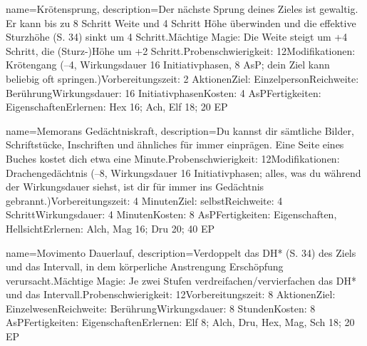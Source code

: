 {
    name={Krötensprung},
    description={Der nächste Sprung deines Zieles ist gewaltig. Er kann bis zu 8 Schritt Weite und 4 Schritt Höhe überwinden und die effektive Sturzhöhe (S. 34) sinkt um 4 Schritt.\newline Mächtige Magie: Die Weite steigt um +4 Schritt,  die (Sturz-)Höhe um +2 Schritt.\newline Probenschwierigkeit: 12\newline Modifikationen: Krötengang (–4, Wirkungsdauer 16 Initiativphasen, 8 AsP; dein Ziel kann beliebig oft springen.)\newline Vorbereitungszeit: 2 Aktionen\newline Ziel: Einzelperson\newline Reichweite: Berührung\newline Wirkungsdauer: 16 Initiativphasen\newline Kosten: 4 AsP\newline Fertigkeiten: Eigenschaften\newline Erlernen: Hex 16; Ach, Elf 18; 20 EP}
}


{
    name={Memorans Gedächtniskraft},
    description={Du kannst dir sämtliche Bilder, Schriftstücke, Inschriften und ähnliches für immer einprägen. Eine Seite eines Buches kostet dich etwa eine Minute.\newline Probenschwierigkeit: 12\newline Modifikationen: Drachengedächtnis (–8, Wirkungsdauer 16 Initiativphasen; alles, was du während der Wirkungsdauer siehst, ist dir für immer ins Gedächtnis gebrannt.)\newline Vorbereitungszeit: 4 Minuten\newline Ziel: selbst\newline Reichweite: 4 Schritt\newline Wirkungsdauer: 4 Minuten\newline Kosten: 8 AsP\newline Fertigkeiten: Eigenschaften, Hellsicht\newline Erlernen: Alch, Mag 16; Dru 20; 40 EP}
}


{
    name={Movimento Dauerlauf},
    description={Verdoppelt das DH* (S. 34) des Ziels und das Intervall, in dem körperliche Anstrengung Erschöpfung verursacht.\newline Mächtige Magie: Je zwei Stufen verdreifachen/vervierfachen das DH* und das Intervall.\newline Probenschwierigkeit: 12\newline Vorbereitungszeit: 8 Aktionen\newline Ziel: Einzelwesen\newline Reichweite: Berührung\newline Wirkungsdauer: 8 Stunden\newline Kosten: 8 AsP\newline Fertigkeiten: Eigenschaften\newline Erlernen: Elf 8; Alch, Dru, Hex, Mag, Sch 18; 20 EP}
}


